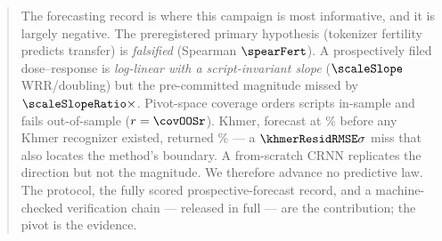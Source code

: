 \begin{abstract}
The forecasting record is where this campaign is most informative, and it is largely negative. The
preregistered primary hypothesis (tokenizer fertility predicts transfer) is \emph{falsified}
(Spearman $\spearFert$). A prospectively filed dose--response is \emph{log-linear with a
script-invariant slope} ($\scaleSlope$ WRR/doubling) but the pre-committed magnitude missed by
$\scaleSlopeRatio\times$. Pivot-space coverage orders scripts in-sample and fails out-of-sample
($r=\covOOSr$). Khmer, forecast at \khmerPred\% before any Khmer recognizer existed, returned
\khmerB\% --- a $\khmerResidRMSE\sigma$ miss that also locates the method's boundary. A
from-scratch CRNN replicates the direction but not the magnitude. We therefore advance no
predictive law. The protocol, the fully scored prospective-forecast record, and a machine-checked
verification chain --- released in full --- are the contribution; the pivot is the evidence.
\end{abstract}
